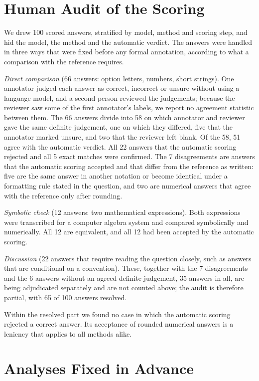 \documentclass[11pt]{article}
\begin{document}
\section{Human Audit of the Scoring}
\label{app:audit}

We drew 100 scored answers, stratified by model, method and scoring step, and hid the model, the method and the automatic verdict.
The answers were handled in three ways that were fixed before any formal annotation, according to what a comparison with the reference requires.

\emph{Direct comparison} (66 answers: option letters, numbers, short strings).
One annotator judged each answer as correct, incorrect or unsure without using a language model, and a second person reviewed the judgements; because the reviewer saw some of the first annotator's labels, we report no agreement statistic between them.
The 66 answers divide into 58 on which annotator and reviewer gave the same definite judgement, one on which they differed, five that the annotator marked unsure, and two that the reviewer left blank.
Of the 58, 51 agree with the automatic verdict.
All 22 answers that the automatic scoring rejected and all 5 exact matches were confirmed.
The 7 disagreements are answers that the automatic scoring accepted and that differ from the reference as written: five are the same answer in another notation or become identical under a formatting rule stated in the question, and two are numerical answers that agree with the reference only after rounding.

\emph{Symbolic check} (12 answers: two mathematical expressions).
Both expressions were transcribed for a computer algebra system and compared symbolically and numerically.
All 12 are equivalent, and all 12 had been accepted by the automatic scoring.

\emph{Discussion} (22 answers that require reading the question closely, such as answers that are conditional on a convention).
These, together with the 7 disagreements and the 6 answers without an agreed definite judgement, 35 answers in all, are being adjudicated separately and are not counted above; the audit is therefore partial, with 65 of 100 answers resolved.

Within the resolved part we found no case in which the automatic scoring rejected a correct answer.
Its acceptance of rounded numerical answers is a leniency that applies to all methods alike.

\section{Analyses Fixed in Advance}
\label{app:prereg}
\end{document}

